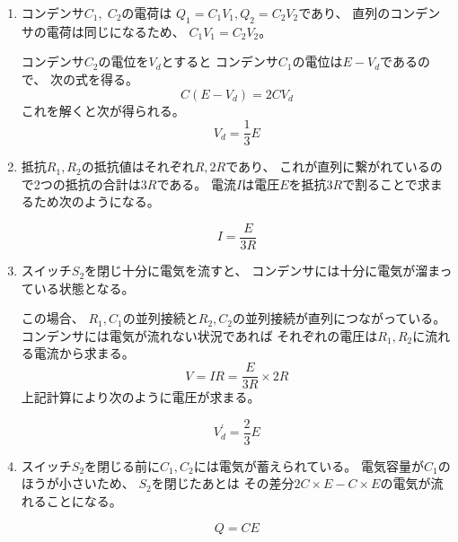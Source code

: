 \documentclass[12pt,b5paper]{ltjsarticle}
\begin{document}
\begin{enumerate}
 \item
      コンデンサ$C_{1},\;C_{2}$の電荷は
      $Q_{1}=C_{1}V_{1},Q_{2}=C_{2}V_{2}$であり、
      直列のコンデンサの電荷は同じになるため、
      $C_{1}V_{1}=C_{2}V_{2}$。

      コンデンサ$C_{2}$の電位を$V_{d}$とすると
      コンデンサ$C_{1}$の電位は$E-V_{d}$であるので、
      次の式を得る。
      \begin{equation}
        C (E-V_{d})=2CV_{d}
      \end{equation}
      これを解くと次が得られる。
      \begin{equation}
       V_{d}=\frac{1}{3}E
      \end{equation}

      \dotfill
 \item
      抵抗$R_{1},R_{2}$の抵抗値はそれぞれ$R,2R$であり、
      これが直列に繋がれているので2つの抵抗の合計は$3R$である。
      電流$I$は電圧$E$を抵抗$3R$で割ることで求まるため次のようになる。

      \begin{equation}
       I=\frac{E}{3R}
      \end{equation}

      \dotfill
 \item

      スイッチ$S_{2}$を閉じ十分に電気を流すと、
      コンデンサには十分に電気が溜まっている状態となる。

      この場合、
      $R_{1},C_{1}$の並列接続と$R_{2},C_{2}$の並列接続が直列につながっている。
      コンデンサには電気が流れない状況であれば
      それぞれの電圧は$R_{1},R_{2}$に流れる電流から求まる。
      \begin{equation}
       V=IR = \frac{E}{3R} \times 2R
      \end{equation}
      上記計算により次のように電圧が求まる。

      \begin{equation}
       V_{d}^{\prime}=\frac{2}{3}E
      \end{equation}

      \dotfill
 \item
      スイッチ$S_{2}$を閉じる前に$C_{1},C_{2}$には電気が蓄えられている。
      電気容量が$C_{1}$のほうが小さいため、
      $S_{2}$を閉じたあとは
      その差分$2C\times E - C\times E$の電気が流れることになる。

      \begin{equation}
       Q=CE
      \end{equation}


\end{enumerate}
\end{document}
